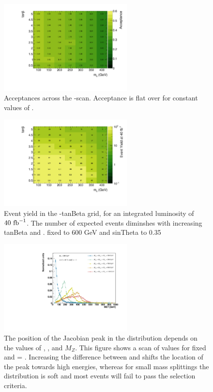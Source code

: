 \begin{figure}
\centering
\includegraphics[width=0.6\textwidth]{texinputs/04_grid/figures/monoz/leptonic/tanbma_ae_ll.pdf}
\caption{Acceptances across the \ma-\tanb scan.  Acceptance is flat over \tanb for constant values of \ma.}
\label{fig:monoz_ll_tanbma_acceptance}
\end{figure}

\begin{figure}
\centering
\includegraphics[width=0.6\textwidth]{texinputs/04_grid/figures/monoz/leptonic/tanbma_yield_ll.pdf}
\caption{Event yield in the \ma-tanBeta grid, for an integrated luminosity of $40~\rm{fb}^{-1}$.  The number of expected events diminshes with increasing tanBeta and \ma.  \mA fixed to 600 GeV and sinTheta to 0.35}
\end{figure}



\begin{figure}
\centering
\includegraphics[width=0.6\textwidth]{texinputs/04_grid/figures/monoz/leptonic/mAscan_for_ma200.pdf}
\caption{The position of the Jacobian peak in the \MET distribution depends on the values of \mH, \ma, and $M_{Z}$.  This figure shows a scan of \mH values for fixed \ma and \mA = \mH.  Increasing the difference between \mH and \ma shifts the location of the peak towards high energies, whereas for small mass splittings the \MET distribution is soft and most events will fail to pass the \MET selection criteria.}   
\label{fig:monoz_ll_mA_scan}
\end{figure}

